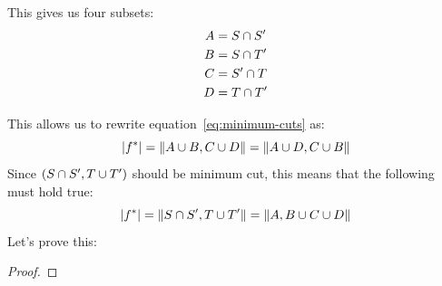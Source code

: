 This gives us four subsets:
\begin{align}
A &= S \cap S' \\
B &= S \cap T' \\
C &= S' \cap T \\
D &= T \cap T' 
\end{align}

This allows us to rewrite equation~\ref{eq:minimum-cuts} as:
\begin{equation}
|f^{*}| = \| A \cup B,  C \cup D \| = \| A \cup D, C \cup B \|
\end{equation}
Since $(S \cap S', T \cup T')$ should be minimum cut, this means that the following must hold true:
\begin{equation}
|f^{*}| = \| S \cap S', T \cup T' \| = \| A, B \cup C \cup D \|
\end{equation}
Let's prove this:
\begin{proof}

\end{proof}